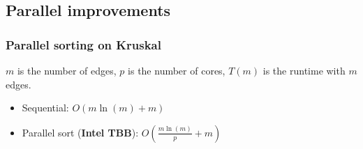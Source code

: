 \documentclass{beamer}
\begin{document}
\subsection{Parallel improvements}

\begin{frame}

    \frametitle{Parallel sorting on Kruskal}

    $m$ is the number of edges, $p$ is the number of cores, $T(m)$ is the runtime with $m$ edges.

    \begin{itemize}
        \item Sequential: $ O \left( m \ln(m) + m \right) $
        \item Parallel sort (\textbf{Intel TBB}): $ O \left( \frac{m \ln(m)}{p} + m \right) $
    \end{itemize}

\end{frame}
\end{document}

